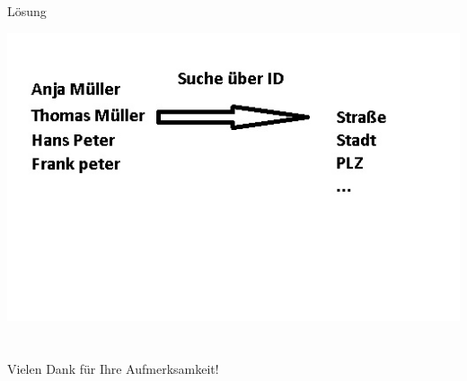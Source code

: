 \documentclass[xcolor={usenames,dvipsnames}, compress, 10pt]{beamer}
\begin{document}
\begin{frame}{Lösung}
\begin{center}


\includegraphics[width=\textheight]{Bilder/presi2.jpg} 

\end{center}
\end{frame}






\section*{}
\begin{frame}{Vielen Dank f\"ur Ihre Aufmerksamkeit!}
\tableofcontents
\end{frame}
\end{document}
